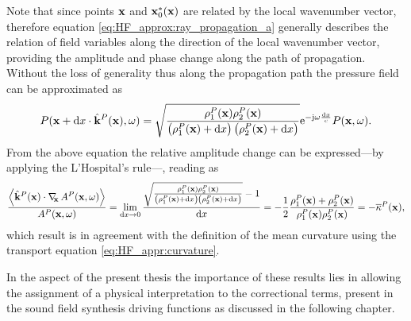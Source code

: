 Note that since points $\mathbf{x}$ and $\mathbf{x}_0^*(\mathbf{x})$ are related by the local wavenumber vector, therefore equation \eqref{eq:HF_approx:ray_propagation_a} generally describes the relation of field variables along the direction of the local wavenumber vector, providing the amplitude and phase change along the path of propagation.
Without the loss of generality thus along the propagation path the pressure field can be approximated as
\begin{equation}
\small
P(\mathbf{x}+\mathrm{d} x \cdot \hat{\mathbf{k}}^P(\mathbf{x}),\omega) =
\sqrt{ \frac{ \rho_1^P(\mathbf{x}) \rho_2^P(\mathbf{x}) }{ \left(\rho_1^P(\mathbf{x}) + \mathrm{d} x \right) \left(\rho_2^P(\mathbf{x}) + \mathrm{d} x\right) } }
\mathrm{e}^{-\mathrm{j} \omega \frac{\mathrm{d} x}{c} } P(\mathbf{x},\omega).
\end{equation}
From the above equation the relative amplitude change can be expressed---by applying the L'Hospital's rule---, reading as
\begin{equation}
\small
\frac{\left< \hat{\mathbf{k}}^P(\mathbf{x}) \cdot \nabla_{\!\!\mathbf{x}}\, A^P(\mathbf{x},\omega) \right>}{A^P(\mathbf{x},\omega)} = \lim_{\mathrm{d} x \rightarrow 0} 
\frac{\sqrt{ \frac{ \rho_1^P(\mathbf{x}) \rho_2^P(\mathbf{x}) }{ \left(\rho_1^P(\mathbf{x}) + \mathrm{d} x \right) \left(\rho_2^P(\mathbf{x}) + \mathrm{d} x\right) } }-1}{\mathrm{d} x}
= 
-\frac{1}{2}\frac{\rho_1^P(\mathbf{x}) + \rho_2^P(\mathbf{x})}{\rho_1^P(\mathbf{x}) \rho_2^P(\mathbf{x})} = -\overline{\kappa}^P(\mathbf{x}),
\end{equation}
which result is in agreement with the definition of the mean curvature using the transport equation \eqref{eq:HF_appr:curvature}.

In the aspect of the present thesis the importance of these results lies in allowing the assignment of a physical interpretation to the correctional terms, present in the sound field synthesis driving functions as discussed in the following chapter.


